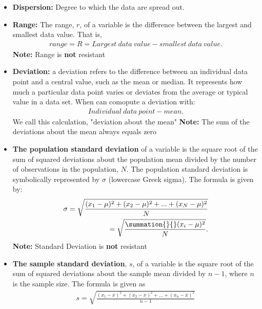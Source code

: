 \documentclass{report}
\begin{document}
        \begin{itemize}
            \item \textbf{Dispersion:} Degree to which the data are spread out. 
            \item \textbf{Range:} The range, $r $, of a variable is the difference between the largest and smallest data value. That is,
                \begin{align*}
                    range = R = Largest\ data\ value- smallest\ data\ value
                .\end{align*}
                \textbf{Note:} Range is \textbf{not} resistant
            \item \textbf{Deviation:} a deviation refers to the difference between an individual data point and a central value, such as the mean or median. It represents how much a particular data point varies or deviates from the average or typical value in a data set. When can comopute a deviation with:
                \begin{align*}
                    Individual\ data\ point - mean
                .\end{align*}
                We call this calculation, "deviation about the mean"
                \bigbreak \noindent 
                \textbf{Note:} The sum of the deviations about the mean always equals zero
            \item \textbf{The population standard deviation} of a variable is the square root of the sum of squared deviations about the population mean divided by the number of observations in the population, $N$. The population standard deviation is symbolically represented by $\sigma$ (lowercase Greek sigma). The formula is given by:
                \begin{align*}
                    \sigma = \sqrt{\frac{(x_{1} - \mu)^{2} + (x_{2}-\mu)^{2}+...+(x_{N}-\mu)^{2}}{N}} \\
                    = \sqrt{\frac{\summation{}{}(x_{i}-\mu)^{2} }{N}}
                .\end{align*}
                \textbf{Note:} Standard Deviation is \textbf{not} resistant
            \item \textbf{The sample standard deviation}, $s $, of a variable is the square root of the sum of squared deviations about the sample mean divided by $n-1 $, where $n$  is the sample size. The formula is given as
                \begin{align*}
                    s = \sqrt{\frac{(x_{1} - \overline{x})^{2}+(x_{2}-\overline{x})^{2}+...+(x_{n}-\overline{x})^{2}}{n-1}}\\

\end{align*}
\end{itemize}
\end{document}
